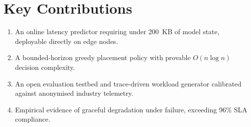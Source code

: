 \section{Key Contributions}
\begin{enumerate}[label=\lbrack C\arabic*\rbrack,leftmargin=2.6em]
  \item An online latency predictor requiring under 200~KB of model state, deployable directly on edge nodes.
  \item A bounded-horizon greedy placement policy with provable $O(n \log n)$ decision complexity.
  \item An open evaluation testbed and trace-driven workload generator calibrated against anonymised industry telemetry.
  \item Empirical evidence of graceful degradation under failure, exceeding 96\% SLA compliance.
\end{enumerate}

